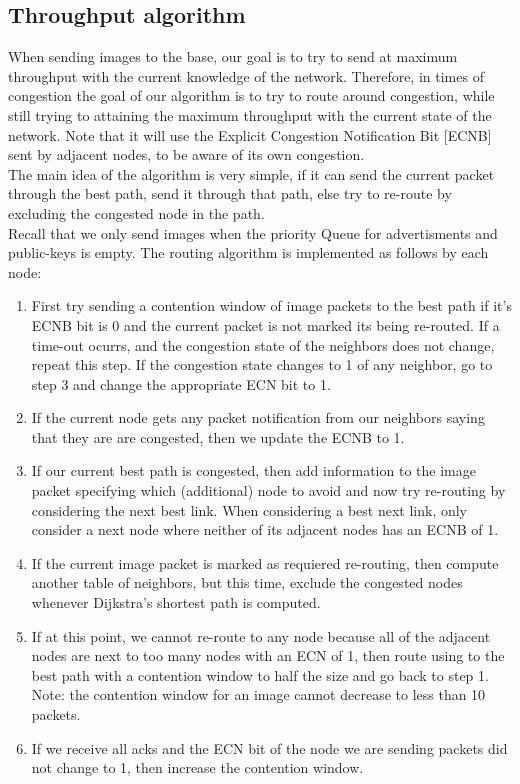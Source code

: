 \documentclass[letterpaper]{article}
\begin{document}
\subsection{Throughput algorithm}

When sending images to the base, our goal is to try to send at maximum throughput with the current knowledge of the network. Therefore, in times of congestion the goal of our algorithm is to try to route around congestion, while still trying to attaining the maximum throughput with the current state of the network. Note that it will use the Explicit Congestion Notification Bit [ECNB] sent by adjacent nodes, to be aware of its own congestion.\\ 

The main idea of the algorithm is very simple, if it can send the current packet through the best path, send it through that path, else try to re-route by excluding the congested node in the path.\\

Recall that we only send images when the priority Queue for advertisments and public-keys is empty. The routing algorithm is implemented as follows by each node:

\begin{enumerate}
  \item First try sending a contention window of image packets to the best path if it's ECNB bit is 0 and the current packet is not marked its being re-routed. If a time-out ocurrs, and the congestion state of the neighbors does not change, repeat this step. If the congestion state changes to 1 of any neighbor, go to step 3 and change the appropriate ECN bit to 1.
  \item If the current node gets any packet notification from our neighbors saying that they are are congested, then we update the ECNB to 1.
  \item If our current best path is congested, then add information to the image packet specifying which (additional) node to avoid and now try re-routing by considering the next best link. When considering a best next link, only consider a next node where neither of its adjacent nodes has an ECNB of 1. 
  \item If the current image packet is marked as requiered re-routing, then compute another table of neighbors, but this time, exclude the congested nodes whenever Dijkstra's shortest path is computed.
  \item If at this point, we cannot re-route to any node because all of the adjacent nodes are next to too many nodes with an ECN of 1, then route using to the best path with a contention window to half the size and go back to step 1. Note: the contention window for an image cannot decrease to less than 10 packets.
  \item If we receive all acks and the ECN bit of the node we are sending packets did not change to 1, then increase the contention window. 
\end{enumerate}
\end{document}
